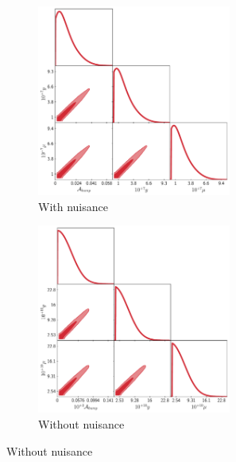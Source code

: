 \begin{figure}
    \centering
    \begin{subfigure}{0.49\textwidth}
        \centering
        \includegraphics[width=0.7\textwidth]{Constraints/Lognormal.pdf}
        \caption{With nuisance}
        \label{fig:LN}        
    \end{subfigure}
    \hfill
    \begin{subfigure}{0.49\textwidth}
        \centering
        \includegraphics[width=0.7\textwidth]{Constraints/LN_NN.pdf}
        \caption{Without nuisance}
        \label{fig:LN_NN}        
    \end{subfigure}

    \vspace{1em}


\end{figure}
